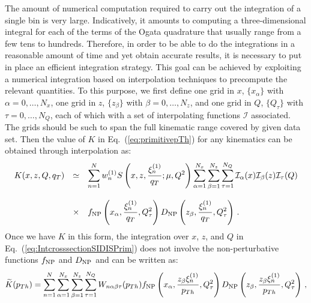 \documentclass[10pt,a4paper]{article}
\begin{document}
The amount of numerical computation required to carry out the
integration of a single bin is very large. Indicatively, it amounts to
computing a three-dimensional integral for each of the terms of the
Ogata quadrature that usually range from a few tens to
hundreds. Therefore, in order to be able to do the integrations in a
reasonable amount of time and yet obtain accurate results, it is
necessary to put in place an efficient integration strategy. This goal
can be achieved by exploiting a numerical integration based on
interpolation techniques to precompute the relevant quantities. To
this purpose, we first define one grid in $x$, $\{x_\alpha\}$ with
$\alpha=0,\dots,N_x$, one grid in $z$, $\{z_\beta\}$ with
$\beta=0,\dots,N_z$, and one grid in $Q$, $\{Q_\tau\}$ with
$\tau=0,\dots,N_Q$, each of which with a set of interpolating
functions $\mathcal{I}$ associated. The grids should be such to span
the full kinematic range covered by given data set. Then the value of
$K$ in Eq.~(\ref{eq:primitivepTh}) for any kinematics can be obtained
through interpolation as:
\begin{equation}
\begin{array}{rcl}
\displaystyle   K(x,z,Q,q_T) &\simeq& \displaystyle 
  \sum_{n=1}^N w_n^{(1)} S\left(x,z,\frac{\xi_n^{(1)}}{q_T};\mu,Q^2\right)
         \sum_{\alpha=1}^{N_x}\sum_{\beta=1}^{N_z}\sum_{\tau=1}^{N_Q}
                                         
                                         \mathcal{I}_\alpha(x)
                                         \mathcal{I}_\beta(z)
                                         \mathcal{I}_\tau(Q) \\
\\
&\times&\displaystyle f_{\rm NP}\left(x_\alpha, \frac{\xi_n^{(1)}}{ q_{T}},Q_\tau^2\right) D_{\rm NP}\left(z_\beta, \frac{\xi_n^{(1)}}{q_{T}},Q_\tau^2\right)\,.
\end{array}
\end{equation}
Once we have $K$ in this form, the integration over $x$, $z$, and $Q$
in Eq.~(\ref{eq:IntcrosssectionSIDISPrim}) does not involve the
non-perturbative functions $f_{\rm NP}$ and $D_{\rm NP}$ and can be
written as:
\begin{equation}\label{eq:numintDIS}
  \widetilde{K}(p_{Th}) = \sum_{n=1}^N 
                                                 \sum_{\alpha=1}^{N_x}\sum_{\beta=1}^{N_z}\sum_{\tau=1}^{N_Q}
                                                 W_{n\alpha\beta\tau}(p_{Th}) f_{\rm NP}\left(x_\alpha, \frac{z_\beta\xi_n^{(1)}}{p_{Th}},Q_\tau^2\right) D_{\rm NP}\left(z_\beta, \frac{z_\beta\xi_n^{(1)}}{p_{Th}},Q_\tau^2\right)\,,
\end{equation}
\end{document}
